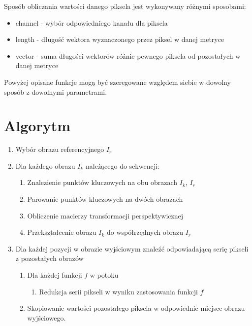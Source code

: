 Sposób obliczania wartości danego piksela jest wykonywany różnymi sposobami:
\begin{itemize}
\item channel - wybór odpowiedniego kanału dla piksela
\item length - długość wektora wyznaczonego przez piksel w danej metryce
\item vector - suma długości wektorów różnic pewnego piksela od pozostałych w danej metryce
\end{itemize}

Powyżej opisane funkcje mogą być szeregowane względem siebie w dowolny sposób z dowolnymi parametrami.
\newpage
\section{Algorytm}

\begin{enumerate}
\item Wybór obrazu referencyjnego $I_r$
\item Dla każdego obrazu $I_k$ należącego do sekwencji:
\begin{enumerate}
\item Znalezienie punktów kluczowych na obu obrazach $I_k$, $I_r$
\item Parowanie punktów kluczowych na dwóch obrazach
\item Obliczenie macierzy transformacji perspektywicznej
\item Przekształcenie obrazu $I_k$ do współrzędnych obrazu $I_r$
\end{enumerate}
\item Dla każdej pozycji w obrazie wyjściowym znaleźć odpowiadającą serię pikseli z pozostałych obrazów
\begin{enumerate}
\item Dla każdej funkcji $f$ w potoku
\begin{enumerate}
\item Redukcja serii pikseli w wyniku zastosowania funkcji $f$
\end{enumerate}
\item Skopiowanie wartości pozostałego piksela w odpowiednie miejsce obrazu wyjściowego.
\end{enumerate}
\end{enumerate}
